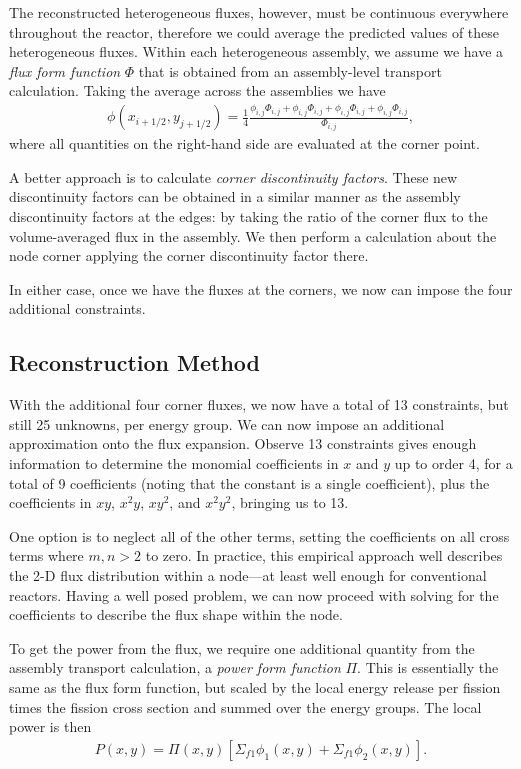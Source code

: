 The reconstructed heterogeneous fluxes, however, must be continuous everywhere throughout the reactor, therefore we could average the predicted values of these heterogeneous fluxes. Within each heterogeneous assembly, we assume we have a \emph{flux form function} $\Phi$ that is obtained from an assembly-level transport calculation. Taking the average across the assemblies we have
\begin{align}
  \phi(x_{i+1/2},y_{j+1/2}) = \frac{1}{4} \frac{ \phi_{i,j} \Phi_{i,j} + \phi_{i,j} \Phi_{i,j} + \phi_{i,j} \Phi_{i,j} + \phi_{i,j} \Phi_{i,j} }{ \Phi_{i,j} } ,
\end{align}
where all quantities on the right-hand side are evaluated at the corner point. 

A better approach is to calculate \emph{corner discontinuity factors}. These new discontinuity factors can be obtained in a similar manner as the assembly discontinuity factors at the edges: by taking the ratio of the corner flux to the volume-averaged flux in the assembly. We then perform a calculation about the node corner applying the corner discontinuity factor there.

In either case, once we have the fluxes at the corners, we now can impose the four additional constraints.




\subsection{Reconstruction Method}

With the additional four corner fluxes, we now have a total of 13 constraints, but still 25 unknowns, per energy group. We can now impose an additional approximation onto the flux expansion. Observe 13 constraints gives enough information to determine the monomial coefficients in $x$ and $y$ up to order 4, for a total of 9 coefficients (noting that the constant is a single coefficient), plus the coefficients in $xy$, $x^2 y$, $x y^2$, and $x^2 y^2$, bringing us to 13. 

One option is to neglect all of the other terms, setting the coefficients on all cross terms where $m, n > 2$ to zero. In practice, this empirical approach well describes the 2-D flux distribution within a node---at least well enough for conventional reactors. Having a well posed problem, we can now proceed with solving for the coefficients to describe the flux shape within the node.

To get the power from the flux, we require one additional quantity from the assembly transport calculation, a \emph{power form function} $\Pi$. This is essentially the same as the flux form function, but scaled by the local energy release per fission times the fission cross section and summed over the energy groups. The local power is then
\begin{align}
  P(x,y) =  \Pi(x,y) \left[ \Sigma_{f1} \phi_1(x,y) +  \Sigma_{f1}  \phi_2(x,y) \right] .
\end{align}





